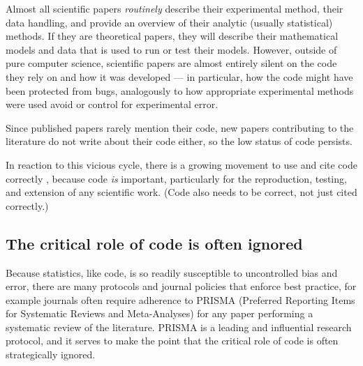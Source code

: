 \documentclass{comjnl}
\begin{document}
Almost all scientific papers \emph{routinely\/} describe their experimental method, their data handling, and provide an overview of their analytic (usually statistical) methods. If they are theoretical papers, they will describe their mathematical models and data that is used to run or test their models. However, outside of pure computer science, scientific papers are almost entirely silent on the code they rely on and how it was developed --- in particular, how the code might have been protected from bugs, analogously to how appropriate experimental methods were used avoid or control for experimental error. 


Since published papers rarely mention their code, new papers contributing to the literature do not write about their code either, so the low status of code persists. 

In reaction to this vicious cycle, there is a growing movement to use and cite code correctly \cite{cite-code,TOP}, because code \emph{is\/} important, particularly for the reproduction, testing, and extension of any scientific work. (Code also needs to be correct, not just cited correctly.)


\subsection{The critical role of code is often ignored}\label{central-role-of-code}\label{PRISMA-statement}
Because statistics, like code, is so readily susceptible to uncontrolled bias and error, there are many protocols and journal policies that enforce best practice, for example journals often require adherence to PRISMA (Preferred Reporting Items for Systematic Reviews and Meta-Analyses) \cite{prisma} for any paper performing a systematic review of the literature. PRISMA is a leading and influential research protocol, and it serves to make the point that the critical role of code is often strategically ignored. 
\end{document}
